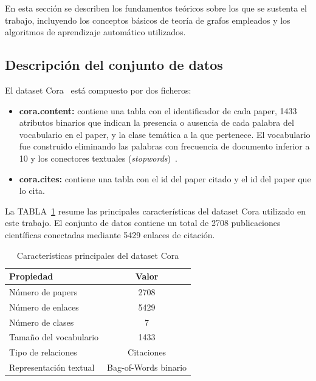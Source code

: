 \documentclass[conference,a4paper]{IEEEtran}
\def\tablename{TABLA}
\begin{document}
En esta sección se describen los fundamentos teóricos sobre los que se 
sustenta el trabajo, incluyendo los conceptos básicos de teoría de grafos 
empleados y los algoritmos de aprendizaje automático utilizados.


\subsection{Descripción del conjunto de datos}

El dataset Cora~\cite{mccallum2024} está compuesto por dos ficheros:

\begin{itemize}
\item \textbf{cora.content:}
    contiene una tabla con el identificador 
    de cada paper, 1433 atributos binarios que indican la presencia o 
    ausencia de cada palabra del vocabulario en el paper, y la clase 
    temática a la que pertenece. El vocabulario fue construido eliminando 
    las palabras con frecuencia de documento inferior a 10 y los 
    conectores textuales (\emph{stopwords})~\cite{mccallum2024}.

\item \textbf{cora.cites:}
    contiene una tabla con el id del paper citado y el id del paper que lo cita.
\end{itemize}

La \tablename~\ref{tab:cora} resume las principales características del dataset Cora utilizado en este trabajo. 
El conjunto de datos contiene un total de 2708 publicaciones científicas conectadas mediante 5429 enlaces de citación. 

\begin{table}[htbp]
  \caption{Características principales del dataset Cora}
  \label{tab:cora}
  \centering
  
  \begin{tabular}{lc}
    \toprule
    Propiedad & Valor \\
    \midrule
    Número de papers & 2708 \\
    Número de enlaces & 5429 \\
    Número de clases & 7 \\
    Tamaño del vocabulario & 1433 \\
    Tipo de relaciones & Citaciones \\
    Representación textual & Bag-of-Words binario \\
    \bottomrule
  \end{tabular}
  
\end{table}
\end{document}
